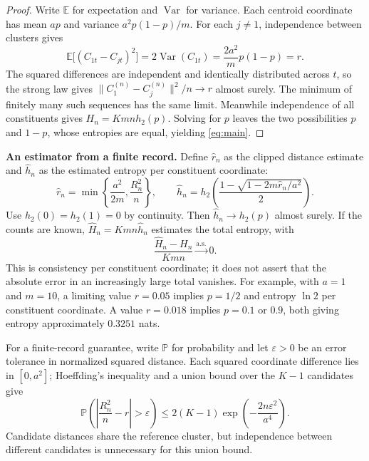 \documentclass[11pt,letterpaper]{article}
\newcommand{\E}{\mathbb E}
\newcommand{\Prob}{\mathbb P}
\newcommand{\hbin}{h_2}
\begin{document}
\begin{proof}
Write $\E$ for expectation and $\operatorname{Var}$ for variance.
Each centroid coordinate has mean $ap$ and variance $a^2p(1-p)/m$.
For each $j\ne1$, independence between clusters gives
\[
 \E\bigl[(C_{1t}-C_{jt})^2\bigr]
 =2\operatorname{Var}(C_{1t})=\frac{2a^2}{m}p(1-p)=r.
\]
The squared differences are independent and identically distributed across
$t$, so the strong law gives $\|C_1^{(n)}-C_j^{(n)}\|^2/n\to r$ almost
surely. The minimum of finitely many such sequences has the same limit.
Meanwhile independence of all constituents gives $H_n=Kmn\hbin(p)$.
Solving for $p$ leaves the two possibilities $p$ and $1-p$, whose entropies
are equal, yielding \eqref{eq:main}.
\end{proof}

\newpage
\textbf{An estimator from a finite record.}
Define $\widehat r_n$ as the clipped distance estimate and $\widehat h_n$
as the estimated entropy per constituent coordinate:
\begin{equation}
 \widehat r_n=\min\!\left\{\frac{a^2}{2m},\frac{R_n^2}{n}\right\},
 \qquad
 \widehat h_n=\hbin\!\left(\frac{1-\sqrt{1-2m\widehat r_n/a^2}}{2}\right).
 \label{eq:estimate}
\end{equation}
Use $\hbin(0)=\hbin(1)=0$ by continuity. Then
$\widehat h_n\to\hbin(p)$ almost surely. If the counts are known,
$\widehat H_n=Kmn\widehat h_n$ estimates the total entropy, with
\[
 \frac{\widehat H_n-H_n}{Kmn}\xrightarrow{\mathrm{a.s.}}0.
\]
This is consistency per constituent coordinate; it does not assert that
the absolute error in an increasingly large total vanishes.
For example, with $a=1$ and $m=10$, a limiting value $r=0.05$ implies
$p=1/2$ and entropy $\ln2$ per constituent coordinate. A value $r=0.018$
implies $p=0.1$ or $0.9$, both giving entropy approximately $0.3251$ nats.

For a finite-record guarantee, write $\Prob$ for probability and let
$\varepsilon>0$ be an error tolerance in normalized squared distance.
Each squared coordinate difference lies in $[0,a^2]$; Hoeffding's inequality
and a union bound over the $K-1$ candidates give
\begin{equation}
 \Prob\!\left(\left|\frac{R_n^2}{n}-r\right|>\varepsilon\right)
 \leq 2(K-1)\exp\!\left(-\frac{2n\varepsilon^2}{a^4}\right).
 \label{eq:concentration}
\end{equation}
Candidate distances share the reference cluster, but independence between
different candidates is unnecessary for this union bound.
\end{document}
